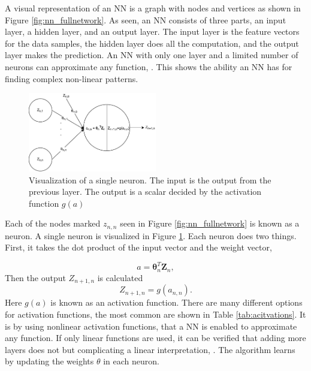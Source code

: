         A visual representation of an NN is a graph with nodes and vertices as shown in Figure \ref{fig:nn_fullnetwork}. As seen, an NN consists of three parts, an input layer, a hidden layer, and an output layer. The input layer is the feature vectors for the data samples, the hidden layer does all the computation, and the output layer makes the prediction. An NN with only one layer and a limited number of neurons can approximate any function, \cite{Hastie}. This shows the ability an NN has for finding complex non-linear patterns.
        
        
        \begin{figure}[h]
            \centering
            \includegraphics[width=0.5\textwidth]{report/figures/techniques/single_neuron.pdf}
            \caption{Visualization of a single neuron. The input is the output from the previous layer. The output is a scalar decided by the activation function $g(a)$}
            \label{fig:nn_neuron}
        \end{figure}
        
        Each of the nodes marked  $z_{n,n}$ seen in Figure \ref{fig:nn_fullnetwork} is known as a neuron. A single neuron is visualized in Figure \ref{fig:nn_neuron}. Each neuron does two things. First, it takes the dot product of the input vector and the weight vector, 
        
        \begin{equation}
            a = \bm \theta_n^T \bm Z_n,
            \label{eq:neuron_a}
        \end{equation}
        Then the output $Z_{n+1,n}$ is calculated 
        \begin{equation}
            Z_{n+1,n} = g(a_{n,n}).
            \label{eq:nn_activation}
        \end{equation}
        Here $g(a)$ is known as an activation function. There are many different options for activation functions, the most common are shown in Table \ref{tab:acitvations}. It is by using nonlinear activation functions, that a NN is enabled to approximate any function. If only linear functions are used, it can be verified that adding more layers does not but complicating a linear interpretation, \cite{Hastie}. The algorithm learns by updating the weights $\theta$ in each neuron.  
        
